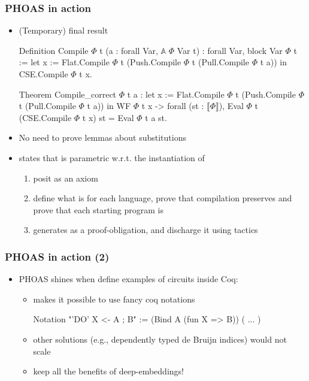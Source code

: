 \documentclass[9pt]{beamer}
\newcommand\denote[1]{\llbracket #1 \rrbracket}
\begin{document}
\begin{frame}[fragile]
  \frametitle{PHOAS in action}

  \begin{itemize}
  \item<+-> (Temporary) final result
\begin{coq}
Definition Compile $\Phi$ t  (a : forall Var, $\mathbb A$ $\Phi$ Var t) : forall Var, block Var $\Phi$ t :=
  let x := Flat.Compile $\Phi$ t (Push.Compile $\Phi$  t (Pull.Compile $\Phi$  t a)) in
  CSE.Compile $\Phi$ t x.
\end{coq}

\begin{coq}
Theorem Compile_correct $\Phi$ t a :
  let x := Flat.Compile $\Phi$ t (Push.Compile $\Phi$  t (Pull.Compile $\Phi$  t a)) in
  WF $\Phi$ t x -> forall (st : $\denote\Phi$),  Eval $\Phi$ t (CSE.Compile $\Phi$ t x) st = Eval $\Phi$ t a st. 
\end{coq}

\item<+-> No need to prove lemmas about substitutions
\item<+->  states that  is parametric w.r.t. the instantiation of 
  \begin{enumerate}
  \item posit  as an axiom
  \item define what is  for each language, prove that compilation preserves  and prove that each starting program is  
  \item generates  as a \alert{proof-obligation}, and discharge it using tactics
  \end{enumerate}
\end{itemize}


\end{frame}
\begin{frame}[fragile]
  \frametitle{PHOAS in action (2)}

  \begin{itemize}
  \item<1-> PHOAS shines when define examples of circuits inside Coq: 
    \begin{itemize}
    \item makes it possible to use fancy coq notations 
\begin{coq}
Notation "'DO' X <- A ; B" := (Bind A (fun X => B)) ( ... )      
\end{coq}
\item other solutions (e.g., dependently typed de Bruijn indices) would not scale
\item keep all the benefits of deep-embeddings!
\end{itemize}
\end{itemize}
\end{frame}
\end{document}
